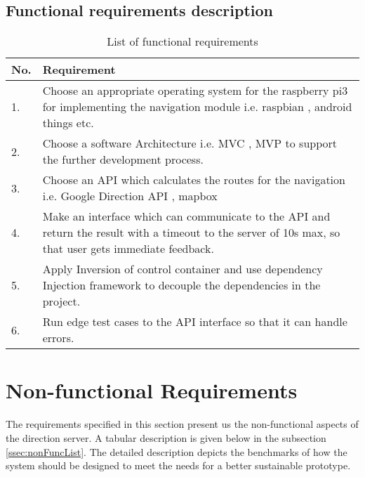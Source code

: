         \subsection{Functional requirements description}
            \label{ssec:FuncList}
            \begin{table}[h!]
                \centering
                    \begin{tabular}{|p{1cm}||p{15cm}|}
                        \hline
                            No. &  Requirement \\
                        \hline
                            1. & Choose an appropriate operating system for the raspberry pi3 for implementing 
                            the navigation module i.e. raspbian \cite{raspbien}, 
                            android things \cite{androidThings} etc.\\
                        \hline
                            2. & Choose a software Architecture i.e. MVC \cite{mvc}, MVP \cite{mvp}
                            to support the further development process.\\ 
                        \hline
                            3. & Choose an API which calculates the routes for the navigation i.e. Google Direction API \cite{googleDirecAPI}, mapbox \cite{mapbox} \\     
                        \hline
                            4. & Make an interface which can communicate to the API and return the result with a 
                            timeout to the server of 10s max, so that user gets immediate feedback. \\    
                        \hline  
                            5. & Apply Inversion of control container and use dependency Injection 
                            \cite{Martinfowler2014} framework to decouple the  dependencies 
                            in the project.\\
                        \hline   
                            6. & Run edge test cases to the API interface so that it can handle
                            errors.\\    
                        \hline    
                    \end{tabular}
                    \caption{List of functional requirements}
                    \label{table:functionalRequirements}
            \end{table}  

    \section{Non-functional Requirements}
        The requirements specified in this section present us the non-functional aspects of the 
        direction server. A tabular description is given below in the subsection 
        \ref{ssec:nonFuncList}. The detailed description depicts the benchmarks of how the system
        should be designed to meet the needs for a better sustainable prototype.

